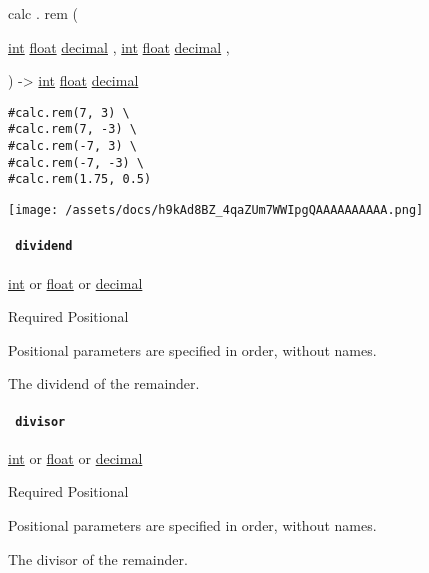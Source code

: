 calc { . } { rem } (

{ \href{/docs/reference/foundations/int/}{int}
\href{/docs/reference/foundations/float/}{float}
\href{/docs/reference/foundations/decimal/}{decimal} , } {
\href{/docs/reference/foundations/int/}{int}
\href{/docs/reference/foundations/float/}{float}
\href{/docs/reference/foundations/decimal/}{decimal} , }

) -\textgreater{} \href{/docs/reference/foundations/int/}{int}
\href{/docs/reference/foundations/float/}{float}
\href{/docs/reference/foundations/decimal/}{decimal}

\begin{verbatim}
#calc.rem(7, 3) \
#calc.rem(7, -3) \
#calc.rem(-7, 3) \
#calc.rem(-7, -3) \
#calc.rem(1.75, 0.5)
\end{verbatim}

\texttt{[image: /assets/docs/h9kAd8BZ\_4qaZUm7WWIpgQAAAAAAAAAA.png]}

\paragraph{\texorpdfstring{\texttt{\ dividend\ }}{ dividend }}\label{functions-rem-dividend}

\href{/docs/reference/foundations/int/}{int} {or}
\href{/docs/reference/foundations/float/}{float} {or}
\href{/docs/reference/foundations/decimal/}{decimal}

{Required} {{ Positional }}

\phantomsection\label{functions-rem-dividend-positional-tooltip}
Positional parameters are specified in order, without names.

The dividend of the remainder.

\paragraph{\texorpdfstring{\texttt{\ divisor\ }}{ divisor }}\label{functions-rem-divisor}

\href{/docs/reference/foundations/int/}{int} {or}
\href{/docs/reference/foundations/float/}{float} {or}
\href{/docs/reference/foundations/decimal/}{decimal}

{Required} {{ Positional }}

\phantomsection\label{functions-rem-divisor-positional-tooltip}
Positional parameters are specified in order, without names.

The divisor of the remainder.

